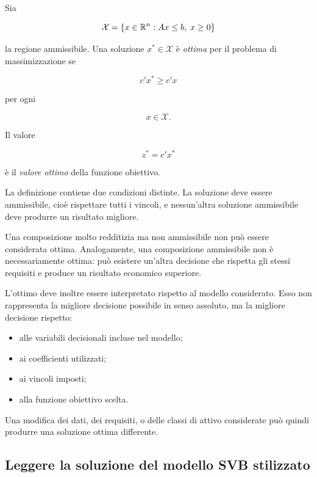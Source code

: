 \begin{definition}

Sia

\[
\mathcal{X}
=
\left\{
x\in\mathbb{R}^n:
Ax\leq b,\;
x\geq0
\right\}
\]

\noindent la regione ammissibile. Una soluzione $x^*\in\mathcal{X}$ \`e
\emph{ottima} per il problema di massimizzazione se

\[
c'x^*\geq c'x
\]

\noindent per ogni

\[
x\in\mathcal{X}.
\]

Il valore

\[
z^*=c'x^*
\]

\noindent \`e il \emph{valore ottimo} della funzione obiettivo.

\end{definition}

La definizione contiene due condizioni distinte. La soluzione deve essere
ammissibile, cio\`e rispettare tutti i vincoli, e nessun'altra soluzione
ammissibile deve produrre un risultato migliore.

Una composizione molto redditizia ma non ammissibile non pu\`o essere
considerata ottima. Analogamente, una composizione ammissibile non \`e
necessariamente ottima: pu\`o esistere un'altra decisione che rispetta gli
stessi requisiti e produce un risultato economico superiore.

L'ottimo deve inoltre essere interpretato rispetto al modello considerato.
Esso non rappresenta la migliore decisione possibile in senso assoluto, ma la
migliore decisione rispetto:

\begin{itemize}

\item alle variabili decisionali incluse nel modello;

\item ai coefficienti utilizzati;

\item ai vincoli imposti;

\item alla funzione obiettivo scelta.

\end{itemize}

Una modifica dei dati, dei requisiti, o delle classi di attivo considerate pu\`o
quindi produrre una soluzione ottima differente.

\subsection{Leggere la soluzione del modello SVB stilizzato}

